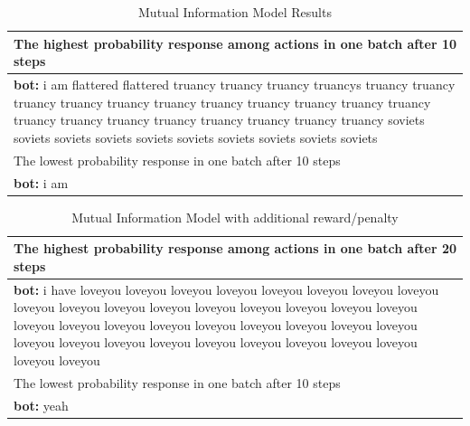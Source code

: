 \documentclass[letterpaper]{article}
\begin{document}
\begin{table}[bt!]
    \centering
    \small
    \caption{\small Mutual Information Model Results}
    \begin{tabularx}{0.48\textwidth}{X}
        \hline \hline
        The highest probability response among actions in one batch after 10 steps \\
        \hline    
        \textbf{bot:} i am flattered flattered truancy truancy truancy truancys truancy truancy truancy truancy truancy truancy truancy truancy truancy truancy truancy truancy truancy truancy truancy truancy truancy truancy  truancy soviets soviets soviets soviets soviets soviets soviets soviets soviets soviets \\
        \hline \hline
        The lowest probability response in one batch after 10 steps \\
        \hline
        \textbf{bot:} i am \\
        \hline \hline  
    \end{tabularx}
    \label{table:mi_01}
\end{table}
\begin{table}[bt!]
    \centering
    \small
    \caption{\small Mutual Information Model with additional reward/penalty}
    \begin{tabularx}{0.48\textwidth}{X}
        \hline \hline
        The highest probability response among actions in one batch after 20 steps \\
        \hline    
        \textbf{bot:} i have loveyou loveyou loveyou loveyou loveyou loveyou loveyou loveyou loveyou loveyou loveyou loveyou loveyou loveyou loveyou loveyou loveyou loveyou loveyou loveyou loveyou loveyou loveyou loveyou loveyou loveyou loveyou loveyou loveyou loveyou loveyou loveyou loveyou loveyou loveyou loveyou loveyou \\
        \hline \hline
        The lowest probability response in one batch after 10 steps \\
        \hline
        \textbf{bot:} yeah \\
        \hline \hline    
    \end{tabularx}
    \label{table:mi_02}
\end{table}
\end{document}
